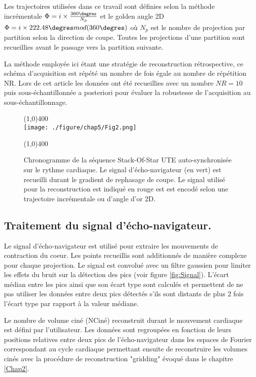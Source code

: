 Les trajectoires utilisées dans ce travail sont définies selon la méthode incrémentale $\Phi = i \times \frac{360\degres}{N_p}$ et le golden angle 2D $\Phi = i \times 222.48\degres mod(360\degres)$ où $N_p$ est le nombre de projection par partition selon la direction de coupe. Toutes les projections d'une partition sont recueillies avant le passage vers la partition suivante.

La méthode employée ici étant une stratégie de reconstruction rétrospective, ce schéma d'acquisition est répété un nombre de fois égale au nombre de répétition NR. Lors de cet article les données ont été recueillies avec un nombre ${NR}=10$ puis sous-échantillonnée a posteriori pour évaluer la robustesse de l'acquisition au sous-échantillonnage.

\begin{figure}[H]
\centering
\line(1,0){400} \\
\texttt{[image: ./figure/chap5/Fig2.png]}
\caption[Séquence auto-synchronisée]{\label{fig:SeqSoSUTE} Chronogramme de la séquence Stack-Of-Star UTE auto-synchronisée sur le rythme cardiaque. Le signal d'écho-navigateur (en vert) est recueilli durant le gradient de rephasage de coupe. Le signal utilisé pour la reconstruction est indiqué en rouge est est encodé selon une trajectoire incrémentale ou d'angle d'or 2D.}
\line(1,0){400} \\ 
\end{figure}

\subsection{Traitement du signal d'écho-navigateur.}

Le signal d'écho-navigateur est utilisé pour extraire les mouvements de contraction du coeur. Les points recueillis sont additionnés de manière complexe pour chaque projection. Le signal est convolué avec un filtre gaussien pour limiter les effets du bruit sur la détection des pics (voir figure \ref{fig:Signal}). L'écart médian entre les pics ainsi que son écart type sont calculés et permettent de ne pas utiliser les données entre deux pics détectés s'ils sont distants de plus 2 fois l'écart type par rapport à la valeur médiane.

Le nombre de volume ciné (NCiné) reconstruit durant le mouvement cardiaque est défini par l'utilisateur. Les données sont regroupées en fonction de leurs positions relatives entre deux pics de l'écho-navigateur dans les espaces de Fourier correspondant au cycle cardiaque permettant ensuite de reconstruire les volumes cinés avec la procédure de reconstruction "gridding" évoqué dans le chapitre \ref{Chap2}.

